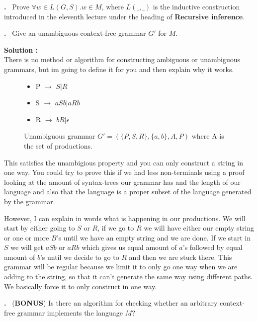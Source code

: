 \documentclass{article}
\newcounter{problem}
\newcounter{solution}
\newcounter{step}
\newcommand\Problem{%
  \stepcounter{problem}%
  \textbf{\theproblem.}~%
  \setcounter{solution}{0}%
  \setcounter{step}{0}%
}
\newcommand\TheSolution{%
  \setcounter{step}{0}%
  \textbf{Solution \theproblem:}\\%
}
\begin{document}
\newpage
\Problem Prove $\forall w \in L(G,S). w \in M$, where $L(\_,\_)$ is the inductive construction introduced
in the eleventh lecture under the heading of \textbf{Recursive inference}.

\newpage
\Problem Give an unambiguous context-free grammar $G'$ for $M$.

\TheSolution There is no method or algorithm for constructing ambiguous or unambiguous grammars, but im
going to define it for you and then explain why it works.

\begin{figure}[h]
\begin{itemize}
  \item[] P $\rightarrow$ $S | R$
  \item[] S $\rightarrow$ $aSb | aRb$
  \item[] R $\rightarrow$ $bR | \epsilon$
\end{itemize}
  \caption{Unambiguous grammar $G' = (\{P, S, R\}, \{a, b\}, A, P)$ where A is the set of productions.}
\end{figure}

This satisfies the unambigious property and you can only construct a string in one way. You could try to
prove this if we had less non-terminals using a proof looking at the amount of syntax-trees our grammar
has and the length of our language and also that the language is a proper subset of the language 
generated by the grammar.

However, I can explain in words what is happening in our productions. We will start by either going to $S$ 
or $R$, if we go to $R$ we will have either our empty string or one or more $B$'s until we have an empty 
string and we are done. If we start in $S$ we will get $aSb$ or $aRb$ which gives us equal amount of 
$a$'s followed by equal amount of $b$'s until we decide to go to $R$ and then we are stuck there. This
grammar will be regular because we limit it to only go one way when we are adding to the string, so that it 
can't generate the same way using different paths. We basically force it to only construct in one way.

\newpage
\Problem (\textbf{BONUS}) Is there an algorithm for checking whether an arbitrary context-free
grammar implements the language $M$?
\end{document}

